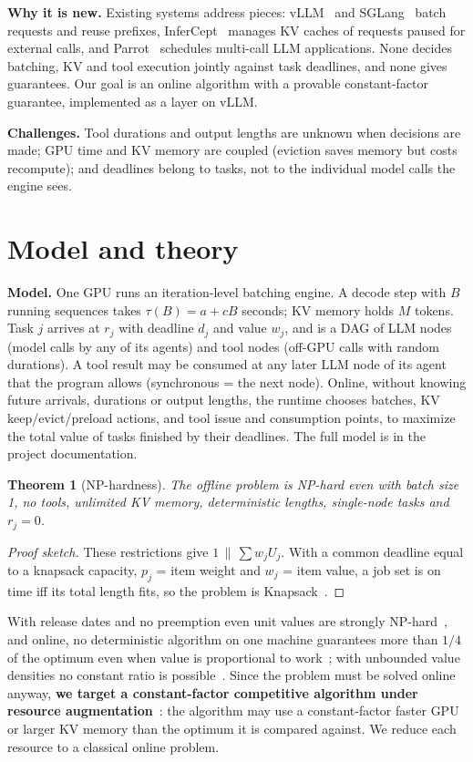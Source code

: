 \documentclass{article}
\newtheorem{theorem}{Theorem}
\begin{document}
\textbf{Why it is new.} Existing systems address pieces: vLLM~\cite{kwon2023vllm} and
SGLang~\cite{zheng2024sglang} batch requests and reuse prefixes, InferCept~\cite{abhyankar2024infercept}
manages KV caches of requests paused for external calls, and Parrot~\cite{lin2024parrot} schedules multi-call
LLM applications. None decides batching, KV and tool execution jointly against task deadlines, and none gives
guarantees. Our goal is an online algorithm with a provable constant-factor guarantee, implemented as a layer on
vLLM.

\textbf{Challenges.} Tool durations and output lengths are unknown when decisions are made; GPU time and KV
memory are coupled (eviction saves memory but costs recompute); and deadlines belong to tasks, not to the
individual model calls the engine sees.

\section{Model and theory}
\label{sec:theory}
\textbf{Model.} One GPU runs an iteration-level batching engine. A decode step with $B$ running sequences takes
$\tau(B)=a+cB$ seconds; KV memory holds $M$ tokens. Task $j$ arrives at $r_j$ with deadline $d_j$ and value
$w_j$, and is a DAG of LLM nodes (model calls by any of its agents) and tool nodes (off-GPU calls with random
durations). A tool result may be consumed at any later LLM node of its agent that the program allows
(synchronous = the next node). Online, without knowing future arrivals, durations or output lengths, the
runtime chooses batches, KV keep/evict/preload actions, and tool issue and consumption points, to maximize the
total value of tasks finished by their deadlines. The full model is in the project documentation.

\begin{theorem}[NP-hardness]
The offline problem is NP-hard even with batch size 1, no tools, unlimited KV memory, deterministic lengths,
single-node tasks and $r_j=0$.
\end{theorem}
\begin{proof}[Proof sketch]
These restrictions give $1\,\|\,\sum w_jU_j$. With a common deadline equal to a knapsack capacity, $p_j$ = item
weight and $w_j$ = item value, a job set is on time iff its total length fits, so the problem is
Knapsack~\cite{karp1972}.
\end{proof}
With release dates and no preemption even unit values are strongly NP-hard~\cite{lenstra1977}, and online,
no deterministic algorithm on one machine guarantees more than $1/4$ of the optimum even when value is
proportional to work~\cite{baruah1992}; with unbounded value densities no constant ratio is
possible~\cite{koren1995}. Since the problem must be solved online anyway, \textbf{we target a constant-factor
competitive algorithm under resource augmentation}~\cite{kalyanasundaram2000}: the algorithm may use a
constant-factor faster GPU or larger KV memory than the optimum it is compared against. We reduce each
resource to a classical online problem.
\end{document}
